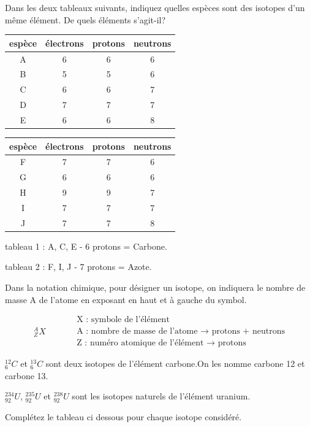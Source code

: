 \documentclass[
  11pt,
  french,
  a4paper,
  openany]{book}
\begin{document}
\begin{Exercise}
Dans les deux tableaux suivants, indiquez quelles espèces sont des isotopes d'un même élément. De quels éléments s'agit-il?

\end{Exercise}

\begin{longtable}[]{@{}cccc@{}}
\toprule
espèce & électrons & protons & neutrons\tabularnewline
\midrule
\endhead
A & 6 & 6 & 6\tabularnewline
B & 5 & 5 & 6\tabularnewline
C & 6 & 6 & 7\tabularnewline
D & 7 & 7 & 7\tabularnewline
E & 6 & 6 & 8\tabularnewline
\bottomrule
\end{longtable}

\begin{longtable}[]{@{}cccc@{}}
\toprule
espèce & électrons & protons & neutrons\tabularnewline
\midrule
\endhead
F & 7 & 7 & 6\tabularnewline
G & 6 & 6 & 6\tabularnewline
H & 9 & 9 & 7\tabularnewline
I & 7 & 7 & 7\tabularnewline
J & 7 & 7 & 8\tabularnewline
\bottomrule
\end{longtable}

\begin{Answer}

tableau 1 : A, C, E - 6 protons = Carbone.

tableau 2 : F, I, J - 7 protons = Azote.

\newpage


\end{Answer}

Dans la notation chimique, pour désigner un isotope, on indiquera le nombre de masse A de l'atome en exposant en haut et à gauche du symbol.

\[ \begin{split}
  _{Z}^{A}X
  \end{split}
  \qquad
  \begin{split}
  & \text{X : symbole de l'élément} \\
    & \text{A : nombre de masse de l'atome $\rightarrow$ protons + neutrons} \\
    & \text{Z : numéro atomique de l'élément $\rightarrow$ protons}
  \end{split} \]

\(_{6}^{12}C\) et \(_{6}^{13}C\) sont deux isotopes de l'élément carbone.On les nomme carbone 12 et carbone 13.

\(_{92}^{234}U\), \(_{92}^{235}U\) et \(_{92}^{238}U\) sont les isotopes naturels de l'élément uranium.

\begin{Exercise}
Complétez le tableau ci dessous pour chaque isotope considéré.

\end{Exercise}
\end{document}
